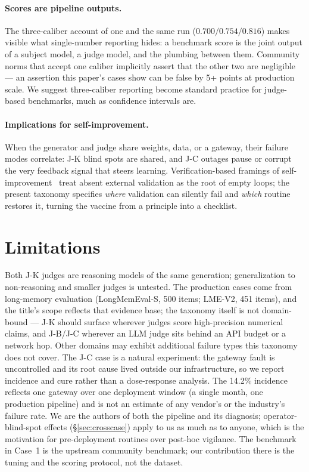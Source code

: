 \documentclass[11pt]{article}
\begin{document}
\paragraph{Scores are pipeline outputs.}
The three-caliber account of one and the same run ($0.700/0.754/0.816$)
makes visible what single-number reporting hides: a benchmark score is the
joint output of a subject model, a judge model, and the plumbing between
them. Community norms that accept one caliber implicitly assert that the
other two are negligible --- an assertion this paper's cases show can be
false by 5+ points at production scale. We suggest three-caliber reporting
become standard practice for judge-based benchmarks, much as confidence
intervals are.

\paragraph{Implications for self-improvement.}
When the generator and judge share weights, data, or a gateway, their
failure modes correlate: J-K blind spots are shared, and J-C outages pause
or corrupt the very feedback signal that steers learning. Verification-based
framings of self-improvement~\cite{emptyloop} treat absent external
validation as the root of empty loops; the present taxonomy specifies
\emph{where} validation can silently fail and \emph{which} routine restores
it, turning the vaccine from a principle into a checklist.

\section{Limitations}
\label{sec:limitations}

Both J-K judges are reasoning models of the same generation; generalization
to non-reasoning and smaller judges is untested. The production cases come
from long-memory evaluation (LongMemEval-S, 500 items; LME-V2, 451 items),
and the title's scope reflects that evidence base; the taxonomy itself is
not domain-bound --- J-K should surface wherever judges score high-precision
numerical claims, and J-B/J-C wherever an LLM judge sits behind an API
budget or a network hop. Other domains may exhibit additional failure types
this taxonomy does not cover. The J-C case is a natural experiment: the gateway fault is
uncontrolled and its root cause lived outside our infrastructure, so we
report incidence and cure rather than a dose-response analysis. The 14.2\%
incidence reflects one gateway over one deployment window (a single month,
one production pipeline) and is not an estimate of any vendor's or the
industry's failure rate. We are the
authors of both the pipeline and its diagnosis; operator-blind-spot effects
(\S\ref{sec:crosscase}) apply to us as much as to anyone, which is the
motivation for pre-deployment routines over post-hoc vigilance. The
benchmark in Case~1 is the upstream community benchmark; our contribution
there is the tuning and the scoring protocol, not the dataset.
\end{document}
